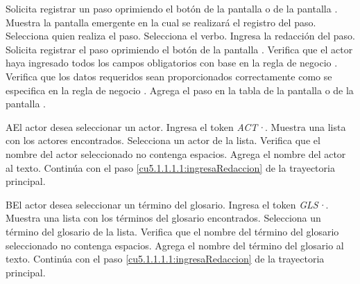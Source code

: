  \begin{UCtrayectoria}
	\UCpaso[\UCactor] Solicita registrar un paso oprimiendo el botón \btnRegistrar de la pantalla  o de la pantalla . 
	\UCpaso[\UCsist] Muestra la pantalla emergente  en la cual se realizará el registro del paso. 
	\UCpaso[\UCactor] Selecciona quien realiza el paso.\label{cu5.1.1.1.1:ingresaDatos}
	\UCpaso[\UCactor] Selecciona el verbo.
	\UCpaso[\UCactor] Ingresa la redacción del paso.           \label{cu5.1.1.1.1:ingresaRedaccion}
	\UCpaso[\UCactor] Solicita registrar el paso oprimiendo el botón  de la pantalla .  
	\UCpaso[\UCsist] Verifica que el actor haya ingresado todos los campos obligatorios con base en la regla de negocio . 
	\UCpaso[\UCsist] Verifica que los datos requeridos sean proporcionados correctamente como se especifica en la regla de negocio .  
	\UCpaso[\UCsist] Agrega el paso en la tabla de la pantalla  o de la pantalla .
\end{UCtrayectoria}

    

 \begin{UCtrayectoriaA}{A}{El actor desea seleccionar un actor.}
 	\UCpaso[\UCactor] Ingresa el token {\it ACT·}.
 	\UCpaso[\UCsist] Muestra una lista con los actores encontrados.
 	\UCpaso[\UCactor] Selecciona un actor de la lista.
  	\UCpaso[\UCsist] Verifica que el nombre del actor seleccionado no contenga espacios. 
  	\UCpaso[\UCsist] Agrega el nombre del actor al texto.
    \UCpaso[] Continúa con el paso \ref{cu5.1.1.1.1:ingresaRedaccion} de la trayectoria principal.
 \end{UCtrayectoriaA}
 \begin{UCtrayectoriaA}{B}{El actor desea seleccionar un término del glosario.}
 	\UCpaso[\UCactor] Ingresa el token {\it GLS·}.	
 	\UCpaso[\UCsist] Muestra una lista con los términos del glosario encontrados.
 	\UCpaso[\UCactor] Selecciona un término del glosario de la lista.
  	\UCpaso[\UCsist] Verifica que el nombre del término del glosario seleccionado no contenga espacios. 
  	\UCpaso[\UCsist] Agrega el nombre del término del glosario al texto.
    \UCpaso[] Continúa con el paso \ref{cu5.1.1.1.1:ingresaRedaccion} de la trayectoria principal.
 \end{UCtrayectoriaA}

